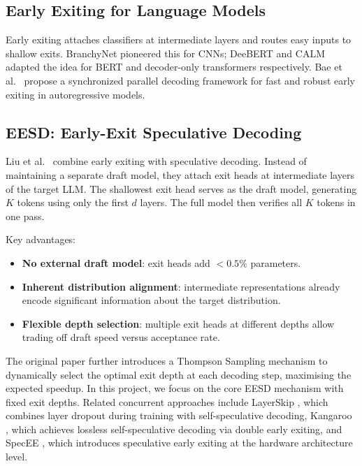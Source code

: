 \documentclass[11pt]{article}
\begin{document}
\subsection{Early Exiting for Language Models}

Early exiting attaches classifiers at intermediate layers and routes easy inputs to shallow exits.  BranchyNet \cite{teerapittayanon2016branchynet} pioneered this for CNNs; DeeBERT \cite{xin2020deebert} and CALM \cite{schuster2022confident} adapted the idea for BERT and decoder-only transformers respectively.  Bae et al.~\cite{bae2023fast} propose a synchronized parallel decoding framework for fast and robust early exiting in autoregressive models.

\subsection{EESD: Early-Exit Speculative Decoding}

Liu et al.~\cite{liu2024eesd} combine early exiting with speculative decoding.  Instead of maintaining a separate draft model, they attach exit heads at intermediate layers of the target LLM.  The shallowest exit head serves as the draft model, generating $K$ tokens using only the first $d$ layers.  The full model then verifies all $K$ tokens in one pass.

Key advantages:
\begin{itemize}
    \item \textbf{No external draft model}: exit heads add $< 0.5\%$ parameters.
    \item \textbf{Inherent distribution alignment}: intermediate representations already encode significant information about the target distribution.
    \item \textbf{Flexible depth selection}: multiple exit heads at different depths allow trading off draft speed versus acceptance rate.
\end{itemize}

The original paper further introduces a Thompson Sampling mechanism to dynamically select the optimal exit depth at each decoding step, maximising the expected speedup.  In this project, we focus on the core EESD mechanism with fixed exit depths.  Related concurrent approaches include LayerSkip \cite{elhoushi2024layerskip}, which combines layer dropout during training with self-speculative decoding, Kangaroo \cite{liu2024kangaroo}, which achieves lossless self-speculative decoding via double early exiting, and SpecEE \cite{xu2025specee}, which introduces speculative early exiting at the hardware architecture level.
\end{document}
